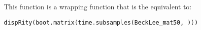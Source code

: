 \documentclass[12pt,letterpaper]{article}
\begin{document}
This function is a wrapping function that is the equivalent to:

\texttt{dispRity(boot.matrix(time.subsamples(BeckLee\_mat50, )))}


  










\end{document}

